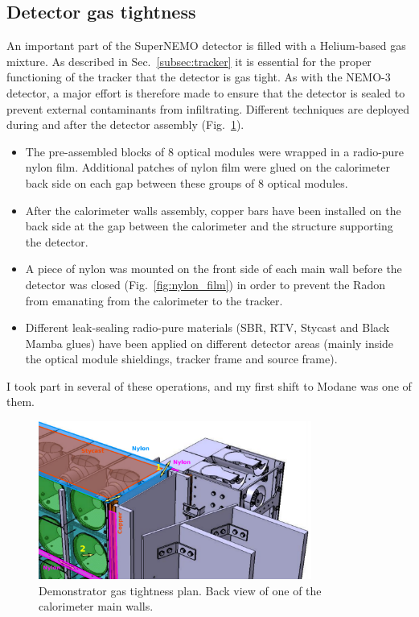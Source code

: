 \subsection{Detector gas tightness}
\label{subsec:sealing}


An important part of the SuperNEMO detector is filled with a Helium-based gas mixture.
As described in Sec.~\ref{subsec:tracker} it is essential for the proper functioning of the tracker that the detector is gas tight.
As with the NEMO-$3$ detector, a major effort is therefore made to ensure that the detector is sealed to prevent external contaminants from infiltrating.
Different techniques are deployed during and after the detector assembly (Fig.~\ref{fig:sealing_plan}).
\begin{itemize}
\item The pre-assembled blocks of $8$ optical modules were wrapped in a radio-pure nylon film.
  Additional patches of nylon film were glued on the calorimeter back side on each gap between these groups of $8$ optical modules.
\item After the calorimeter walls assembly, copper bars have been installed on the back side at the gap between the calorimeter and the structure supporting the detector.
\item A piece of nylon was mounted on the front side of each main wall before the detector was closed (Fig.~\ref{fig:nylon_film}) in order to prevent the Radon from emanating from the calorimeter to the tracker.
\item Different leak-sealing radio-pure materials (SBR, RTV, Stycast and Black Mamba glues) have been applied on different detector areas (mainly inside the optical module shieldings, tracker frame and source frame).
\end{itemize}
I took part in several of these operations, and my first shift to Modane was one of them.
\begin{figure}[h!]
\centering
\includegraphics[width=0.8\textwidth]{SNdemonstrator/fig_SNdemonstrator/leaks.pdf}
\caption{Demonstrator gas tightness plan.
  Back view of one of the calorimeter main walls.
\label{fig:sealing_plan}}
\end{figure}
